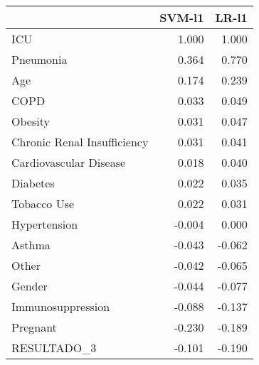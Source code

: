\begin{tabular}{lrr}
\toprule
{} &  SVM-l1 &  LR-l1 \\
\midrule
ICU                         &   1.000 &  1.000 \\
Pneumonia                   &   0.364 &  0.770 \\
Age                         &   0.174 &  0.239 \\
COPD                        &   0.033 &  0.049 \\
Obesity                     &   0.031 &  0.047 \\
Chronic Renal Insufficiency &   0.031 &  0.041 \\
Cardiovascular Disease      &   0.018 &  0.040 \\
Diabetes                    &   0.022 &  0.035 \\
Tobacco Use                 &   0.022 &  0.031 \\
Hypertension                &  -0.004 &  0.000 \\
Asthma                      &  -0.043 & -0.062 \\
Other                       &  -0.042 & -0.065 \\
Gender                      &  -0.044 & -0.077 \\
Immunosuppression           &  -0.088 & -0.137 \\
Pregnant                    &  -0.230 & -0.189 \\
RESULTADO\_3                 &  -0.101 & -0.190 \\
\bottomrule
\end{tabular}
